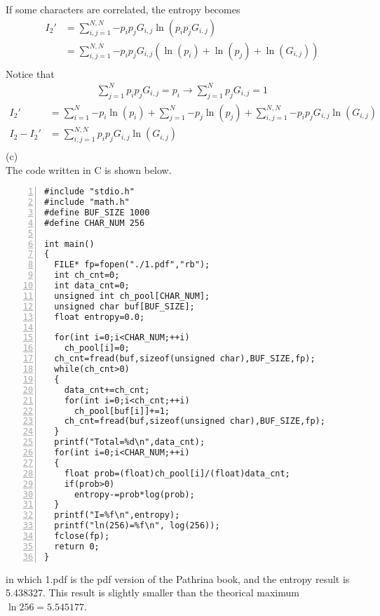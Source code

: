 \documentclass{article}
\begin{document}
	If some characters are correlated, the entropy becomes\\
	\begin{align}
		I_2'&=\sum\limits_{i,j=1}^{N,N}{-p_ip_jG_{i,j}\ln(p_ip_jG_{i,j})}\\
		&=\sum\limits_{i,j=1}^{N,N}{-p_ip_jG_{i,j}(\ln(p_i)+\ln(p_j)+\ln(G_{i,j}))}\\
	\end{align}
	Notice that
	\begin{align}
		\sum\limits_{j=1}^{N}{p_ip_jG_{i,j}}=p_i\rightarrow\sum\limits_{j=1}^{N}{p_jG_{i,j}}=1
	\end{align}
	\begin{align}
		I_2'&=\sum\limits_{i=1}^{N}{-p_i\ln(p_i)}+\sum\limits_{j=1}^{N}{-p_j\ln(p_j)}+\sum\limits_{i,j=1}^{N,N}{-p_ip_jG_{i,j}\ln(G_{i,j})}\\
		I_2-I_2'&=\sum\limits_{i,j=1}^{N,N}{p_ip_jG_{i,j}\ln(G_{i,j})}\\
	\end{align}
	(c)\\
	The code written in C is shown below.
	\begin{lstlisting}[language={[ANSI]C},numbers=left,basicstyle=\ttfamily]
#include "stdio.h"
#include "math.h"
#define BUF_SIZE 1000
#define CHAR_NUM 256

int main()
{
  FILE* fp=fopen("./1.pdf","rb");
  int ch_cnt=0;
  int data_cnt=0;
  unsigned int ch_pool[CHAR_NUM];
  unsigned char buf[BUF_SIZE];
  float entropy=0.0;

  for(int i=0;i<CHAR_NUM;++i)
    ch_pool[i]=0;
  ch_cnt=fread(buf,sizeof(unsigned char),BUF_SIZE,fp);
  while(ch_cnt>0)
  {
    data_cnt+=ch_cnt;
    for(int i=0;i<ch_cnt;++i)
      ch_pool[buf[i]]+=1;
    ch_cnt=fread(buf,sizeof(unsigned char),BUF_SIZE,fp);
  }
  printf("Total=%d\n",data_cnt);
  for(int i=0;i<CHAR_NUM;++i)
  {
    float prob=(float)ch_pool[i]/(float)data_cnt;
    if(prob>0)
      entropy-=prob*log(prob);
  }
  printf("I=%f\n",entropy);
  printf("ln(256)=%f\n", log(256));
  fclose(fp);
  return 0;
}
	\end{lstlisting}
	in which 1.pdf is the pdf version of the Pathrina book, and the entropy result is 5.438327. This result is slightly smaller than the theorical maximum $\ln{256}=5.545177$.
\end{document}
